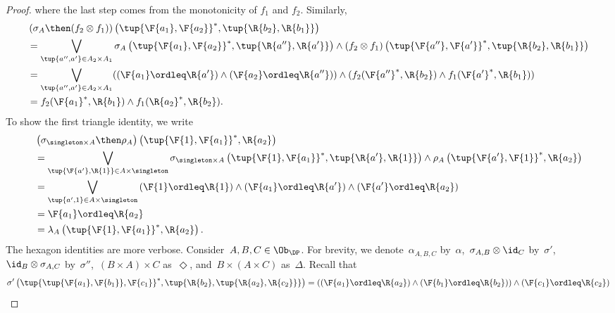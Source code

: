\begin{proof}
    where the last step comes from the monotonicity of $f_1$ and $f_2$. Similarly,
    \begin{equation}
        \begin{aligned}
           &\left( \sigma_A \then (f_2\otimes f_1)\right)\left( \tup{\F{a_1},\F{a_2}}^*,\tup{\R{b_2},\R{b_1}}\right)\\
           &=\bigvee_{\tup{a'',a'}\in A_2\times A_1}\sigma_A\left(\tup{\F{a_1},\F{a_2}}^*,\tup{\R{a''},\R{a'}} \right)\wedge \left(f_2\otimes f_1\right) \left( \tup{\F{a''},\F{a'}}^*,\tup{\R{b_2},\R{b_1}}\right)\\
           &=\bigvee_{\tup{a'',a'}\in A_2\times A_1}(\left(\F{a_1}\ordleq \R{a'}\right)\wedge \left(\F{a_2}\ordleq \R{a''}\right)) \wedge (f_2(\F{a''}^*,\R{b_2})\wedge f_1(\F{a'}^*,\R{b_1}))\\
           &= f_2(\F{a_1}^*,\R{b_1}) \wedge f_1(\R{a_2}^*,\R{b_2}).
        \end{aligned}
    \end{equation}
    To show the first triangle identity, we write
    \begin{equation}
        \begin{aligned}
           &\left(\sigma_{\singleton \times A}\then \rho_A\right)\left( \tup{\F{1},\F{a_1}}^*,\R{a_2}\right)\\
           &=\bigvee_{\tup{\F{a'},\R{1}}\in A\times \singleton}\sigma_{\singleton \times A}\left( \tup{\F{1},\F{a_1}}^*,\tup{\R{a'},\R{1}}\right)\wedge \rho_A\left( \tup{\F{a'},\F{1}}^*,\R{a_2}\right)\\
           &=\bigvee_{\tup{a',1}\in A\times \singleton} \left(\F{1}\ordleq \R{1}\right) \wedge \left(\F{a_1}\ordleq \R{a'}\right)\wedge \left(\F{a'}\ordleq \R{a_2}\right)\\
           &=\F{a_1}\ordleq \R{a_2}\\
           &=\lambda_A\left( \tup{\F{1},\F{a_1}}^*,\R{a_2}\right).
        \end{aligned}
    \end{equation}
    The hexagon identities are more verbose. Consider~$A,B,C\in \Ob_\DP$. For brevity, we denote~$\alpha_{A,B,C}$ by~$\alpha$,~$\sigma_{A,B}\otimes \id_C$ by~$\sigma'$,~$\id_B \otimes \sigma_{A,C}$ by~$\sigma''$,~$(B\times A)\times C$ as~$\Diamond$, and~$B\times (A\times C)$ as~$\Delta$. Recall that
    \begin{equation}
        \begin{aligned}
            \sigma' \left(\tup{\tup{\F{a_1},\F{b_1}},\F{c_1}}^*,\tup{\R{b_2},\tup{\R{a_2},\R{c_2}}} \right)&=\left( (\F{a_1}\ordleq \R{a_2})  \wedge (\F{b_1}\ordleq \R{b_2})\right)\wedge (\F{c_1}\ordleq \R{c_2})\\

\end{aligned}
\end{equation}
\end{proof}
